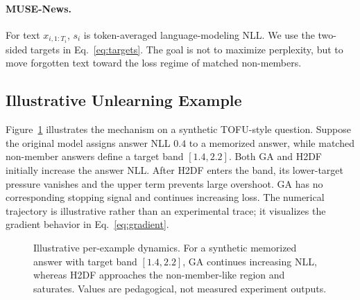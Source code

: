 \documentclass[10pt,twocolumn]{article}
\newcommand{\method}{\textsc{H2DF}}
\begin{document}
\paragraph{MUSE-News.}
For text $x_{i,1:T_i}$, $s_i$ is token-averaged language-modeling NLL. We use
the two-sided targets in Eq.~\eqref{eq:targets}. The goal is not to maximize
perplexity, but to move forgotten text toward the loss regime of matched
non-members.

\subsection{Illustrative Unlearning Example}

Figure~\ref{fig:example} illustrates the mechanism on a synthetic TOFU-style
question. Suppose the original model assigns answer NLL $0.4$ to a memorized
answer, while matched non-member answers define a target band $[1.4,2.2]$.
Both GA and \method{} initially increase the answer NLL. After \method{} enters
the band, its lower-target pressure vanishes and the upper term prevents large
overshoot. GA has no corresponding stopping signal and continues increasing
loss. The numerical trajectory is illustrative rather than an experimental
trace; it visualizes the gradient behavior in Eq.~\eqref{eq:gradient}.

\begin{figure}[t]
\centering
{}
\caption{Illustrative per-example dynamics. For a synthetic memorized answer
with target band $[1.4,2.2]$, GA continues increasing NLL, whereas \method{}
approaches the non-member-like region and saturates. Values are pedagogical,
not measured experiment outputs.}
\label{fig:example}
\end{figure}
\FloatBarrier
\end{document}
